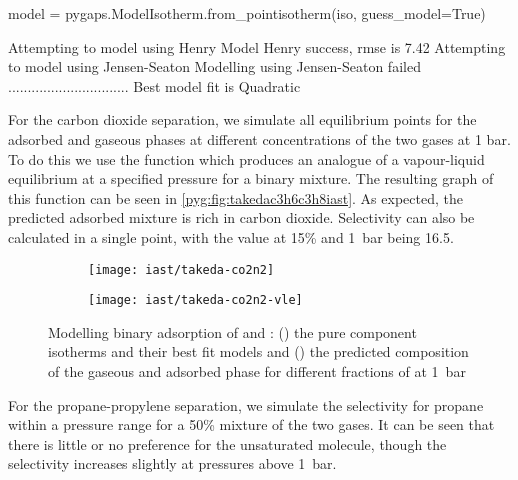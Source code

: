 \begin{python}[caption={Guessing the best model},label={lst:model}]
model = pygaps.ModelIsotherm.from_pointisotherm(iso, guess_model=True)
\end{python}
\begin{pythonout}
Attempting to model using Henry
Model Henry success, rmse is 7.42
Attempting to model using Jensen-Seaton
Modelling using Jensen-Seaton failed
...............................
Best model fit is Quadratic
\end{pythonout}

For the carbon dioxide separation, we simulate all equilibrium 
points for the adsorbed and gaseous phases at different concentrations 
of the two gases at 1 bar. To do this we use the 
function which produces an analogue of a vapour-liquid equilibrium at 
a specified pressure for a binary mixture. The resulting graph of this
function can be seen in \autoref{pyg:fig:takedac3h6c3h8iast}.
As expected, the predicted adsorbed mixture is rich in carbon dioxide.
Selectivity can also be calculated in a single point, with the value at 
15\%  and \SI{1}{bar} being 16.5. 

\begin{figure}[htb]

    \centering
    \begin{subfigure}[b]{.5\textwidth}
        \centering
        \texttt{[image: iast/takeda-co2n2]}
        \caption{}%
        \label{pyg:fig:takedaco2n2iso}
    \end{subfigure}%
    \begin{subfigure}[b]{.5\textwidth}
        \centering
        \texttt{[image: iast/takeda-co2n2-vle]}
        \caption{}%
        \label{pyg:fig:takedaco2n2iast}
    \end{subfigure}
    \caption{
    Modelling binary adsorption of  and : 
    (\protect{}) the pure component
    isotherms and their best fit models and 
    (\protect{}) 
    the predicted composition of the gaseous
    and adsorbed phase for different fractions of 
     at \SI{1}{\bar}
    }%
    \label{pyg:fig:takedaco2n2}

\end{figure}

For the propane-propylene separation, we simulate the selectivity for
propane within a pressure range for a 50\% mixture of the two gases. 
It can be seen that there is little or no preference for the 
unsaturated molecule, though the selectivity increases slightly at 
pressures above \SI{1}{\bar}.

